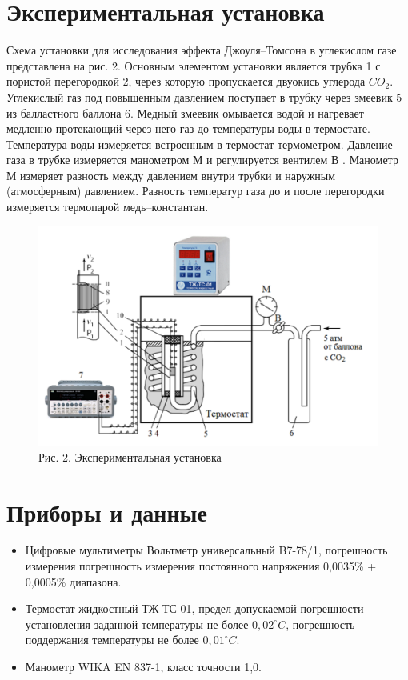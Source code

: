 \documentclass[a4paper]{article}
\begin{document}
\section{Экспериментальная установка}
Схема установки для исследования эффекта Джоуля–Томсона в углекислом газе
представлена на рис. 2. Основным элементом установки является трубка 1 с пористой
перегородкой 2, через которую пропускается двуокись углерода $CO_2$. Углекислый газ под повышенным давлением поступает в трубку через змеевик 5
из балластного баллона 6. Медный змеевик омывается водой и нагревает медленно
протекающий через него газ до температуры воды в термостате. Температура воды
измеряется встроенным в термостат термометром. Давление газа в трубке измеряется манометром М и регулируется вентилем В . Манометр М измеряет разность между давлением внутри трубки и наружным (атмосферным) давлением. Разность температур газа до и после перегородки измеряется термопарой медь–константан.
\begin{figure}[h!]
        \centering
        \includegraphics[scale=0.5]{Pictures/ustanovka.png}
        \caption{
        Рис. 2. Экспериментальная установка
        }
 \end{figure} 


\section{Приборы и данные}
\begin{itemize}
    \item Цифровые мультиметры Вольтметр универсальный B7-78/1, погрешность измерения погрешность измерения постоянного напряжения 0,0035\% + 0,0005\% диапазона. 
    \item Термостат жидкостный ТЖ-ТС-01, предел допускаемой погрешности установления заданной температуры не более $0,02 ^\circ C$, погрешность поддержания температуры не более $0,01 ^\circ C$.
    \item Манометр WIKA EN 837-1, класс точности 1,0.
\end{itemize}
\end{document}

